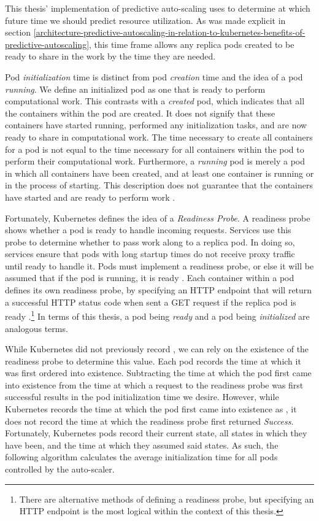 This thesis' implementation of predictive auto-scaling uses
 to determine at which future time we should predict
resource utilization. As was made explicit in section
\ref{architecture-predictive-autoscaling-in-relation-to-kubernetes-benefits-of-predictive-autoscaling},
this time frame allows any replica pods created to be ready to share in the work by the
time they are needed.

Pod \textit{initialization} time is distinct from pod \textit{creation} time and
the idea of a pod \textit{running}. We define an initialized pod as one that is
ready to perform computational work. This contrasts with a \textit{created} pod,
which indicates that all the containers within the pod are created. It
does not signify that these containers have started running, performed any
initialization tasks, and are now ready to share in computational work. The time
necessary to create all containers for a pod is not equal to the time necessary
for all containers within the pod to perform their computational work.
Furthermore, a \textit{running} pod is merely a pod in which all containers have
been created, and at least one container is running or in the process of
starting. This description does not guarantee that the containers have started
and are ready to perform work \cite{k8s-pod-states}.

Fortunately, Kubernetes defines the idea of a \textit{Readiness Probe}. A
readiness probe shows whether a pod is ready to handle incoming requests.
Services use this probe to determine whether to pass work along to a
replica pod. In doing so, services ensure that pods with long startup times do not
receive proxy traffic until ready to handle it. Pods must implement a readiness
probe, or else it will be assumed that if the pod is running, it is ready
\cite{k8s-pod-states}. Each container within a pod defines its own readiness
probe, by specifying an HTTP endpoint that will return a successful HTTP status
code when sent a GET request if the replica pod is ready
\cite{k8s-working-with-containers}.\footnote{There are alternative methods of
defining a readiness probe, but specifying an HTTP endpoint is the most logical
within the context of this thesis.} In terms of this thesis, a
pod being \textit{ready} and a pod being \textit{initialized} are analogous
terms.

While Kubernetes did not previously record ,
we can rely on the existence of the readiness probe to
determine this value. Each pod records the time at which it was first ordered into
existence. Subtracting the time at which the pod first came into existence
from the time at which a request to the readiness probe was first successful
results in the pod initialization time we desire. However, while Kubernetes
records the time at which the pod first came into existence as
, it does not record the time at which the
readiness probe first returned \textit{Success}. Fortunately, Kubernetes pods
record their current state, all states in which they have been, and the time
at which they assumed said states. As such, the following algorithm
calculates the average initialization time for all pods controlled by the auto-scaler.

